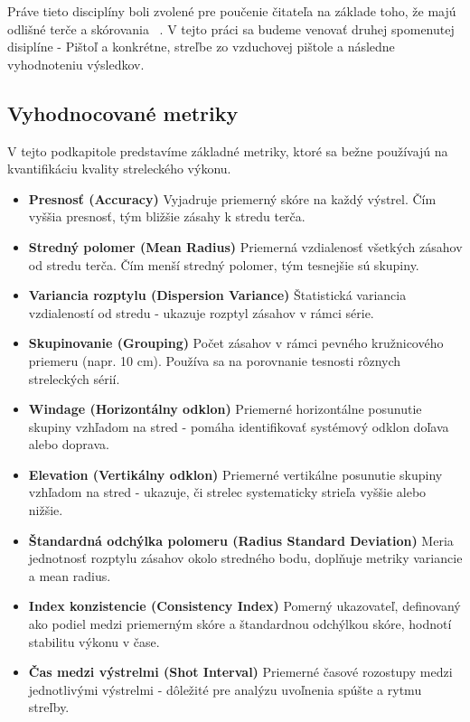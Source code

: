 Práve tieto disciplíny boli zvolené pre poučenie čitateľa na základe toho, že majú odlišné terče a
skórovania ~\cite{roberts2024understanding}. V tejto práci sa budeme venovať druhej spomenutej disiplíne - Pištoľ a konkrétne, streľbe zo vzduchovej pištole
a následne vyhodnoteniu výsledkov.

\subsection{Vyhodnocované metriky}
V tejto podkapitole predstavíme základné metriky, ktoré sa bežne používajú na kvantifikáciu kvality streleckého výkonu.

\begin{itemize}
  \item \textbf{Presnosť (Accuracy)}  
    Vyjadruje priemerný skóre na každý výstrel. Čím vyššia presnosť, tým bližšie zásahy k stredu terča.  
    \cite{TargetShootingAppMetrics}

  \item \textbf{Stredný polomer (Mean Radius)}  
    Priemerná vzdialenosť všetkých zásahov od stredu terča. Čím menší stredný polomer, tým tesnejšie sú skupiny.  
    \cite{ISSFTargetPlot}

  \item \textbf{Variancia rozptylu (Dispersion Variance)}  
    Štatistická variancia vzdialeností od stredu - ukazuje rozptyl zásahov v rámci série.  
    \cite{RedditWRIPJA2C}

  \item \textbf{Skupinovanie (Grouping)}  
    Počet zásahov v rámci pevného kružnicového priemeru (napr. 10 cm). Používa sa na porovnanie tesnosti rôznych streleckých sérií.  
    \cite{EncryptedTBN0GC}

  \item \textbf{Windage (Horizontálny odklon)}  
    Priemerné horizontálne posunutie skupiny vzhľadom na stred - pomáha identifikovať systémový odklon doľava alebo doprava.  
    \cite{EncryptedTBN0GC}

  \item \textbf{Elevation (Vertikálny odklon)}  
    Priemerné vertikálne posunutie skupiny vzhľadom na stred - ukazuje, či strelec systematicky strieľa vyššie alebo nižšie.  
    \cite{EncryptedTBN0GC}

  \item \textbf{Štandardná odchýlka polomeru (Radius Standard Deviation)}  
    Meria jednotnosť rozptylu zásahov okolo stredného bodu, doplňuje metriky variancie a mean radius.  
    \cite{TargetShootingAppMetrics}

  \item \textbf{Index konzistencie (Consistency Index)}  
    Pomerný ukazovateľ, definovaný ako podiel medzi priemerným skóre a štandardnou odchýlkou skóre, hodnotí stabilitu výkonu v čase.  
    \cite{TargetShootingAppMetrics}

  \item \textbf{Čas medzi výstrelmi (Shot Interval)}  
    Priemerné časové rozostupy medzi jednotlivými výstrelmi - dôležité pre analýzu uvoľnenia spúšte a rytmu streľby.  
    \cite{TargetShootingAppMetrics}

\end{itemize}


